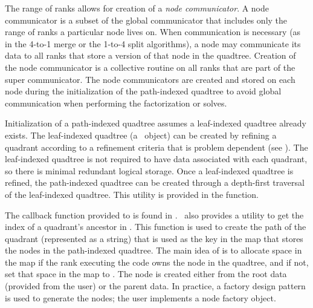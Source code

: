 The range of ranks allows for creation of a {\em node communicator}. A node communicator is a subset of the global communicator that includes only the range of ranks a particular node lives on. When communication is necessary (as in the 4-to-1 merge or the 1-to-4 split algorithms), a node may communicate its data to all ranks that store a version of that node in the quadtree. Creation of the node communicator is a collective routine on all ranks that are part of the super communicator. The node communicators are created and stored on each node during the initialization of the path-indexed quadtree to avoid global communication when performing the factorization or solves.

Initialization of a path-indexed quadtree assumes a leaf-indexed quadtree already exists. The leaf-indexed quadtree (a \pforest\ object) can be created by refining a quadrant according to a refinement criteria that is problem dependent (see ). The leaf-indexed quadtree is not required to have data associated with each quadrant, so there is minimal redundant logical storage. Once a leaf-indexed quadtree is refined, the path-indexed quadtree can be created through a depth-first traversal of the leaf-indexed quadtree. This utility is provided in the  function.

The callback function provided to  is found in . \pforest\ also provides a utility to get the index of a quadrant's ancestor in . This function is used to create the path of the quadrant (represented as a string) that is used as the key in the map that stores the nodes in the path-indexed quadtree. The main idea of  is to allocate space in the map if the rank executing the code owns the node in the quadtree, and if not, set that space in the map to . The node is created either from the root data (provided from the user) or the parent data. In practice, a factory design pattern is used to generate the nodes; the user implements a node factory object.

